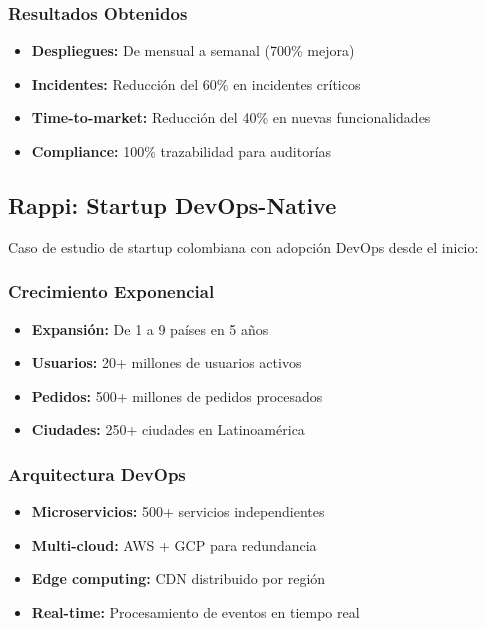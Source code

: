 \documentclass[12pt,a4paper]{article}
\begin{document}
\subsubsection{Resultados Obtenidos}
\begin{itemize}
    \item \textbf{Despliegues:} De mensual a semanal (700\% mejora)
    \item \textbf{Incidentes:} Reducción del 60\% en incidentes críticos
    \item \textbf{Time-to-market:} Reducción del 40\% en nuevas funcionalidades
    \item \textbf{Compliance:} 100\% trazabilidad para auditorías
\end{itemize}

\subsection{Rappi: Startup DevOps-Native}
Caso de estudio de startup colombiana con adopción DevOps desde el inicio:

\subsubsection{Crecimiento Exponencial}
\begin{itemize}
    \item \textbf{Expansión:} De 1 a 9 países en 5 años
    \item \textbf{Usuarios:} 20+ millones de usuarios activos
    \item \textbf{Pedidos:} 500+ millones de pedidos procesados
    \item \textbf{Ciudades:} 250+ ciudades en Latinoamérica
\end{itemize}

\subsubsection{Arquitectura DevOps}
\begin{itemize}
    \item \textbf{Microservicios:} 500+ servicios independientes
    \item \textbf{Multi-cloud:} AWS + GCP para redundancia
    \item \textbf{Edge computing:} CDN distribuido por región
    \item \textbf{Real-time:} Procesamiento de eventos en tiempo real
\end{itemize}
\end{document}
